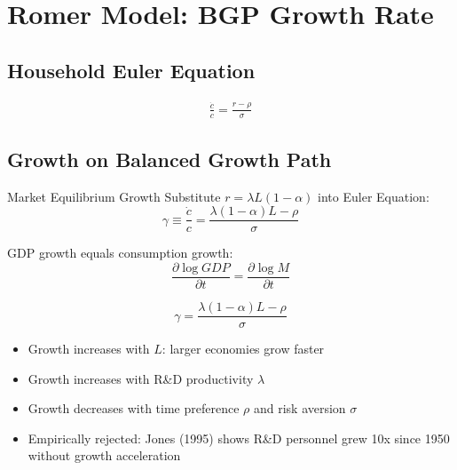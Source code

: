 \documentclass[a4paper,11pt]{article}
\begin{document}
\clearpage

\section{Romer Model: BGP Growth Rate}

\subsection*{Household Euler Equation}
\begin{align*}
\frac{\dot{c}}{c} = \frac{r - \rho}{\sigma} \tag{EE}
\end{align*}

\medskip
\subsection*{Growth on Balanced Growth Path}
\begin{derivationbox}{Market Equilibrium Growth}
Substitute $r = \lambda L (1-\alpha)$ into Euler Equation:
\[
\gamma \equiv \frac{\dot{c}}{c} = \frac{\lambda(1-\alpha)L - \rho}{\sigma}
\]

GDP growth equals consumption growth:
\[
\frac{\partial \log GDP}{\partial t} = \frac{\partial \log M}{\partial t}
\]
\end{derivationbox}

\begin{resultbox}
\[
\boxed{\gamma = \frac{\lambda(1-\alpha)L - \rho}{\sigma}}
\tag{Romer Growth Rate}
\]
\end{resultbox}

\medskip
\begin{tcolorbox}[colback=yellow!10,colframe=yellow!60,title=Scale Effects]
\begin{itemize}
    \item Growth increases with $L$: larger economies grow faster
    \item Growth increases with R\&D productivity $\lambda$
    \item Growth decreases with time preference $\rho$ and risk aversion $\sigma$
    \item Empirically rejected: Jones (1995) shows R\&D personnel grew 10x since 1950 without growth acceleration
\end{itemize}
\end{tcolorbox}
\end{document}
